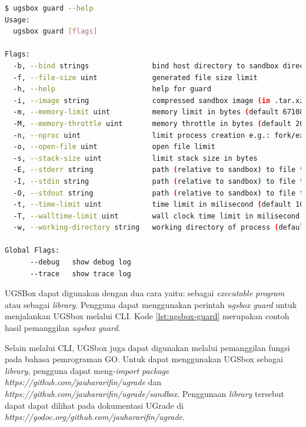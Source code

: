 \begin{lstlisting}[caption={Contoh Hasil Eksekusi Perintah \textit{ugsbox}},label={lst:ugsbox-guard},language=Bash,style=BashStyle]
$ ugsbox guard --help
Usage:
  ugsbox guard [flags]

Flags:
  -b, --bind strings               bind host directory to sandbox directory with format <hostdir>:<sandboxdir>. Warning: file owner of binded directory will be changed
  -f, --file-size uint             generated file size limit
  -h, --help                       help for guard
  -i, --image string               compressed sandbox image (in .tar.xz) path
  -m, --memory-limit uint          memory limit in bytes (default 67108864)
  -M, --memory-throttle uint       memory throttle in bytes (default 268435456)
  -n, --nproc uint                 limit process creation e.g.: fork/exec
  -o, --open-file uint             open file limit
  -s, --stack-size uint            limit stack size in bytes
  -E, --stderr string              path (relative to sandbox) to file to be used as stderr
  -I, --stdin string               path (relative to sandbox) to file to be used as stdin
  -O, --stdout string              path (relative to sandbox) to file to be used as stdout
  -t, --time-limit uint            time limit in milisecond (default 10000)
  -T, --walltime-limit uint        wall clock time limit in milisecond (default 10000)
  -w, --working-directory string   working directory of process (default "/home")

Global Flags:
      --debug   show debug log
      --trace   show trace log
\end{lstlisting}

\par UGSBox dapat digunakan dengan dua cara yaitu: sebagai \textit{executable program} atau sebagai \textit{library}. Pengguna dapat menggunakan perintah \textit{ugsbox guard} untuk menjalankan UGSbox melalui CLI. Kode \ref{lst:ugsbox-guard} merupakan contoh hasil pemanggilan \textit{ugsbox guard}.

\par Selain melalui CLI, UGSbox juga dapat digunakan melalui pemanggilan fungsi pada bahasa pemrograman GO. Untuk dapat menggunakan UGSbox sebagai \textit{library}, pengguna dapat meng-\textit{import} \textit{package https://github.com/jauhararifin/ugrade} dan \textit{https://github.com/jauhararifin/ugrade/sandbox}. Penggunaan \textit{library} tersebut dapat dapat dilihat pada dokumentasi UGrade di \textit{https://godoc.org/github.com/jauhararifin/ugrade}.

